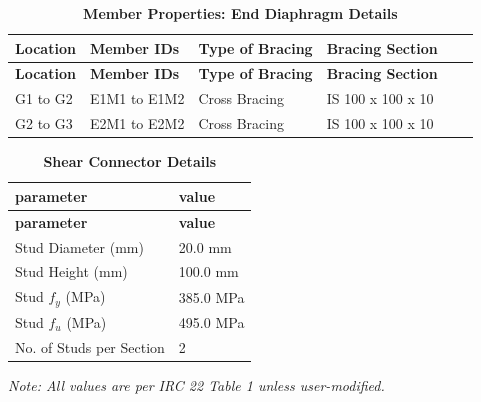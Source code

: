 \documentclass[12pt,a4paper]{report}
\numberwithin{table}{chapter}
\numberwithin{figure}{chapter}
\begin{document}
\vspace{0.4em}
\noindent
\setlength{\tabcolsep}{4pt}
\setlength\LTleft{0pt}
\setlength\LTright{\fill}

\begin{longtable}{|L{2.2cm}|L{2.2cm}|L{3.0cm}|L{2.5cm}|C{1.8cm}|C{1.8cm}|}
\caption{\textbf{Member Properties: End Diaphragm Details}}\\
\hline
\textbf{Location} & \textbf{Member IDs} & \textbf{Type of Bracing} & \textbf{Bracing Section} \\
\hline
\endfirsthead

\hline
\textbf{Location} & \textbf{Member IDs} & \textbf{Type of Bracing} & \textbf{Bracing Section} \\
\hline
\endhead
\hline
\endlastfoot
G1 to G2 & E1M1 to E1M2 & Cross Bracing & IS 100 x 100 x 10 \\[6pt]
\hline
G2 to G3 & E2M1 to E2M2 & Cross Bracing & IS 100 x 100 x 10 \\[6pt]
\end{longtable}



\label{subsec:shear-connectors}

\vspace{2.2em}

\vspace{0.4em}
\begin{longtable}{|L{5.5cm}|p{10.0cm}|}
\caption{\textbf{Shear Connector Details}}\\
\hline
\textbf{parameter} & \textbf{value} \\
\hline
\endfirsthead

\hline
\textbf{parameter} & \textbf{value} \\
\hline
\endhead
\hline
\endlastfoot
\textnormal{Stud Diameter (mm)} & 20.0 mm \\[6pt]
\hline
\textnormal{Stud Height (mm)} & 100.0 mm \\[6pt]
\hline
\textnormal{Stud $f_y$ (MPa)} & 385.0 MPa \\[6pt]
\hline
\textnormal{Stud $f_u$ (MPa)} & 495.0 MPa \\[6pt]
\hline
\textnormal{No. of Studs per Section} & 2 \\[6pt]
\end{longtable}



\label{subsec:safety-factors}

\vspace{2.2em}

\vspace{0.3em}
\noindent\textit{Note: All values are per IRC 22 Table 1 unless user-modified.}
\end{document}
